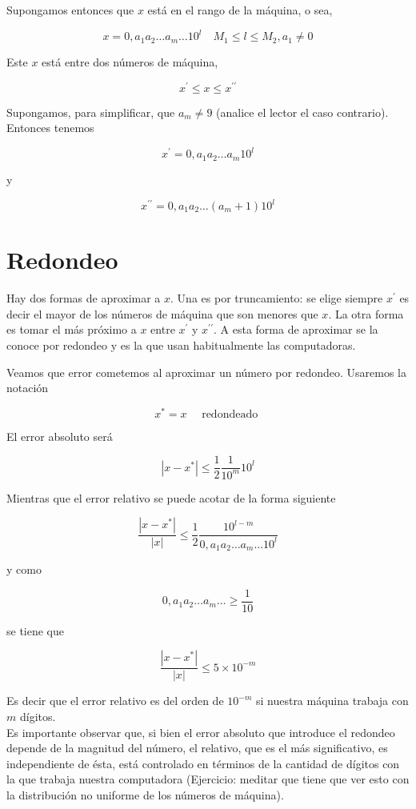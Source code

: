 \documentclass[10pt]{book}
\begin{document}
Supongamos entonces que $x$ está en el rango de la máquina, o sea,

$$
x=0, a_{1} a_{2} \ldots a_{m} \ldots 10^{l} \quad M_{1} \leq l \leq M_{2}, a_{1} \neq 0
$$

Este $x$ está entre dos números de máquina,

$$
x^{\prime} \leq x \leq x^{\prime \prime}
$$

Supongamos, para simplificar, que $a_{m} \neq 9$ (analice el lector el caso contrario). Entonces tenemos

$$
x^{\prime}=0, a_{1} a_{2} \ldots a_{m} 10^{l}
$$

y

$$
x^{\prime \prime}=0, a_{1} a_{2} \ldots\left(a_{m}+1\right) 10^{l}
$$

\section{Redondeo}
Hay dos formas de aproximar a $x$. Una es por truncamiento: se elige siempre $x^{\prime}$ es decir el mayor de los números de máquina que son menores que $x$. La otra forma es tomar el más próximo a $x$ entre $x^{\prime}$ y $x^{\prime \prime}$. A esta forma de aproximar se la conoce por redondeo y es la que usan habitualmente las computadoras.

Veamos que error cometemos al aproximar un número por redondeo. Usaremos la notación

$$
x^{*}=x \quad \text { redondeado }
$$

El error absoluto será

$$
\left|x-x^{*}\right| \leq \frac{1}{2} \frac{1}{10^{m}} 10^{l}
$$

Mientras que el error relativo se puede acotar de la forma siguiente

$$
\frac{\left|x-x^{*}\right|}{|x|} \leq \frac{1}{2} \frac{10^{l-m}}{0, a_{1} a_{2} \ldots a_{m} \ldots 10^{l}}
$$

y como

$$
0, a_{1} a_{2} \ldots a_{m} \ldots \geq \frac{1}{10}
$$

se tiene que

$$
\frac{\left|x-x^{*}\right|}{|x|} \leq 5 \times 10^{-m}
$$

Es decir que el error relativo es del orden de $10^{-m}$ si nuestra máquina trabaja con $m$ dígitos.\\
Es importante observar que, si bien el error absoluto que introduce el redondeo depende de la magnitud del número, el relativo, que es el más significativo, es independiente de ésta, está controlado en términos de la cantidad de dígitos con la que trabaja nuestra computadora (Ejercicio: meditar que tiene que ver esto con la distribución no uniforme de los números de máquina).
\end{document}
